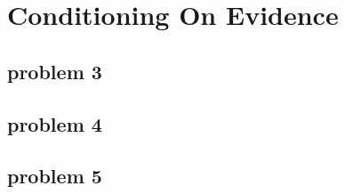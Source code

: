 \section{Conditioning On Evidence}

\subsection{problem 3}


\subsection{problem 4}


\subsection{problem 5}
